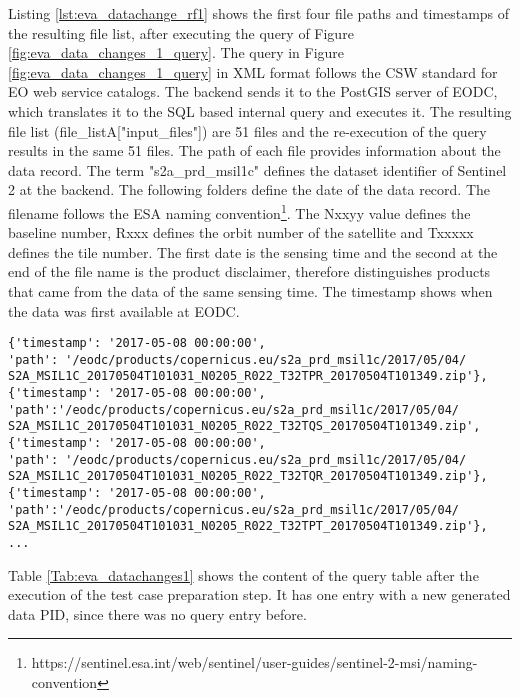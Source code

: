 \documentclass[draft,final]{vutinfth} %
\newenvironment{code}{\captionsetup{type=listing}}{}
\begin{document}
\begin{enumerate}
	Listing \ref{lst:eva_datachange_rf1} shows the first four file paths and timestamps of the resulting file list, after executing the query of Figure \ref{fig:eva_data_changes_1_query}. {The query in Figure \ref{fig:eva_data_changes_1_query} in XML format follows the CSW standard for EO web service catalogs. The backend sends it to the PostGIS server of EODC, which translates it to the SQL based internal query and executes it.} The resulting file list (file\_listA["input\_files"]) are 51 files and the re-execution of the query results in the same 51 files. The path of each file provides information about the data record. The term "s2a\_prd\_msil1c" defines the dataset identifier of Sentinel 2 at the backend. The following folders define the date of the data record. The filename follows the ESA naming convention\footnote{https://sentinel.esa.int/web/sentinel/user-guides/sentinel-2-msi/naming-convention}. The Nxxyy value defines the baseline number, Rxxx defines the orbit number of the satellite and Txxxxx defines the tile number. The first date is the sensing time and the second at the end of the file name is the product disclaimer, therefore distinguishes products that came from the data of the same sensing time. The timestamp shows when the data was first available at EODC.
	\newpage
	\begin{code}
		\begin{verbatim}
{'timestamp': '2017-05-08 00:00:00', 
'path': '/eodc/products/copernicus.eu/s2a_prd_msil1c/2017/05/04/
S2A_MSIL1C_20170504T101031_N0205_R022_T32TPR_20170504T101349.zip'}, 
{'timestamp': '2017-05-08 00:00:00',
'path':'/eodc/products/copernicus.eu/s2a_prd_msil1c/2017/05/04/
S2A_MSIL1C_20170504T101031_N0205_R022_T32TQS_20170504T101349.zip', 
{'timestamp': '2017-05-08 00:00:00', 
'path': '/eodc/products/copernicus.eu/s2a_prd_msil1c/2017/05/04/
S2A_MSIL1C_20170504T101031_N0205_R022_T32TQR_20170504T101349.zip'}, 
{'timestamp': '2017-05-08 00:00:00',
'path':'/eodc/products/copernicus.eu/s2a_prd_msil1c/2017/05/04/
S2A_MSIL1C_20170504T101031_N0205_R022_T32TPT_20170504T101349.zip'},
...
		\end{verbatim}
		\caption{First four resulting files with creation timestamp.}
		\label{lst:eva_datachange_rf1}
	\end{code}
	
	Table \ref{Tab:eva_datachanges1} shows the content of the query table after the execution of the test case preparation step. It has one entry with a new generated data PID, since there was no query entry before.
	

\end{enumerate}
\end{document}
